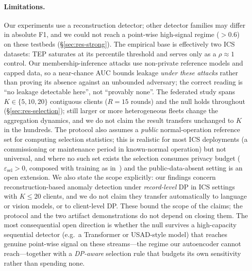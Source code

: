 \documentclass[pdflatex,sn-mathphys-num]{sn-jnl}
\theoremstyle{thmstyleone}
\theoremstyle{thmstyletwo}
\theoremstyle{thmstylethree}
\begin{document}
\paragraph{Limitations.} Our experiments use a reconstruction detector; other detector
families may differ in absolute F1, and we could not reach a point-wise high-signal
regime ($>0.6$) on these testbeds (\S\ref{sec:res-strong}). The empirical base is
effectively two ICS datasets: TEP saturates at its percentile threshold and serves
only as a $\rho\approx1$ control. Our membership-inference attacks use non-private
reference models and capped data, so a near-chance AUC bounds leakage \emph{under
these attacks} rather than proving its absence against an unbounded adversary; the
correct reading is ``no leakage detectable here'', not ``provably none''. The federated
study spans $K\in\{5,10,20\}$ contiguous clients ($R{=}15$ rounds) and the null holds
throughout (\S\ref{sec:res-selection}); still larger or more heterogeneous fleets
change the aggregation dynamics, and we do not claim the result transfers unchanged to
$K$ in the hundreds. The protocol also assumes a \emph{public} normal-operation
reference set for computing selection statistics; this is realistic for most ICS
deployments (a commissioning or maintenance period in known-normal operation) but not
universal, and where no such set exists the selection consumes privacy budget
($\varepsilon_{\text{sel}}>0$, composed with training as in~\cite{nguyen2025coreset})
and the public-data-absent setting is an open extension. We also state the scope explicitly: our findings concern reconstruction-based anomaly detection under
\emph{record-level} DP in ICS settings with $K\le20$ clients, and we do not claim they
transfer automatically to language or vision models, or to client-level DP. These bound
the scope of the claims; the protocol and the two artifact demonstrations do not depend
on closing them. The most consequential open direction is
whether the null survives a high-capacity sequential detector (e.g.\ a Transformer or
USAD-style model) that reaches genuine point-wise signal on these streams---the regime
our autoencoder cannot reach---together with a \emph{DP-aware} selection rule that
budgets its own sensitivity rather than spending none.
\end{document}
